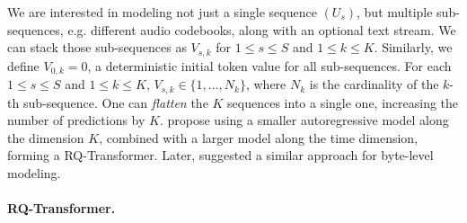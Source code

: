 We are interested in modeling not just a single sequence $(U_s)$, but multiple sub-sequences, e.g. different audio codebooks, along with an optional text stream. We can stack those sub-sequences as $V_{s, k}$ for $1 \leq s \leq S$ and $1 \leq k \leq K$.
Similarly, we define $V_{0, k} = 0$, a deterministic initial token value for all sub-sequences.
For each $1 \leq s\leq S$ and $1 \leq k\leq K$, $V_{s, k} \in \{1, \ldots, N_k\}$, where $N_k$ is the cardinality of the $k$-th sub-sequence. One can \emph{flatten} the $K$ sequences into a single one, increasing the number of predictions by $K$.
\citet{rqtransformer} propose using a smaller autoregressive model along the dimension $K$, combined with a larger model along the time dimension, forming a RQ-Transformer. Later, \citet{yu2024megabyte} suggested a similar approach for byte-level modeling.

\paragraph{RQ-Transformer.}

